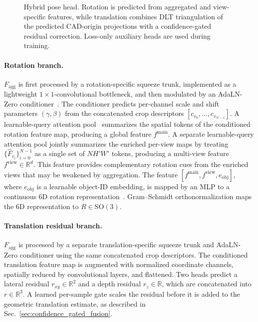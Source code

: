 
\begin{figure}[!htbp]
\centering


\caption{Hybrid pose head. Rotation is predicted from aggregated and view-specific features, while translation combines DLT triangulation of the predicted CAD-origin projections with a confidence-gated residual correction. Loss-only auxiliary heads are used during training.}

\label{fig:hybrid_pose_head}
\end{figure}

\paragraph{Rotation branch.}
\(F_{\mathrm{agg}}\) is first processed by a rotation-specific squeeze trunk, implemented as a lightweight \(1\times1\)-convolutional bottleneck, and then modulated by an AdaLN-Zero conditioner~\cite{peebles2023dit}.
The conditioner predicts per-channel scale and shift parameters \((\gamma,\beta)\) from the concatenated crop descriptors \([c_{v_0},\ldots,c_{v_{N-1}}]\).
A learnable-query attention pool~\cite{lee2019set} summarizes the spatial tokens of the conditioned rotation feature map, producing a global feature \(f^{\mathrm{main}}\).
A separate learnable-query attention pool jointly summarizes the enriched per-view maps by treating \(\{\hat{F}_{v_i}\}_{i=0}^{N-1}\) as a single set of \(NH'W'\) tokens, producing a multi-view feature \(f^{\mathrm{view}}\in\mathbb{R}^{d}\).
This feature provides complementary rotation cues from the enriched views that may be weakened by aggregation.
The feature \([f^{\mathrm{main}},f^{\mathrm{view}},e_{\mathrm{obj}}]\), where \(e_{\mathrm{obj}}\) is a learnable object-ID embedding, is mapped by an MLP to a continuous 6D rotation representation~\cite{zhou2019rotationcontinuity}.
Gram--Schmidt orthonormalization maps the 6D representation to \(R\in\mathrm{SO}(3)\).

\paragraph{Translation residual branch.}
\(F_{\mathrm{agg}}\) is processed by a separate translation-specific squeeze trunk and AdaLN-Zero conditioner using the same concatenated crop descriptors.
The conditioned translation feature map is augmented with normalized coordinate channels, spatially reduced by convolutional layers, and flattened.
Two heads predict a lateral residual \(r_{xy}\in\mathbb{R}^{2}\) and a depth residual \(r_z\in\mathbb{R}\), which are concatenated into \(r\in\mathbb{R}^{3}\).
A learned per-sample gate scales the residual before it is added to the geometric translation estimate, as described in Sec.~\ref{sec:confidence_gated_fusion}.

